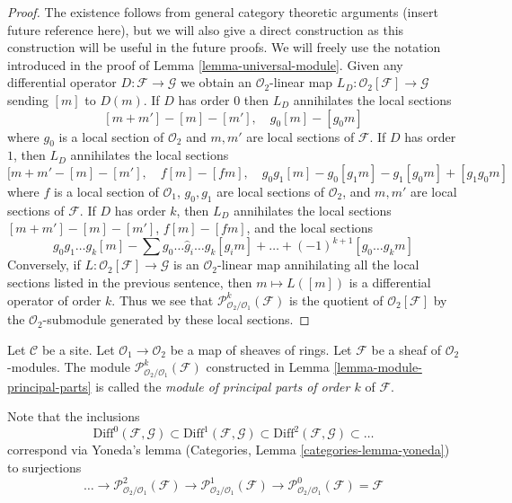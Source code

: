 \begin{proof}
The existence follows from general category theoretic arguments
(insert future reference here), but we will also give a direct
construction as this construction will be useful in the future proofs.
We will freely use the notation introduced in the proof of
Lemma \ref{lemma-universal-module}.
Given any differential operator $D : \mathcal{F} \to \mathcal{G}$
we obtain an $\mathcal{O}_2$-linear map
$L_D : \mathcal{O}_2[\mathcal{F}] \to \mathcal{G}$
sending $[m]$ to $D(m)$. If $D$ has order $0$
then $L_D$ annihilates the local sections
$$
[m + m'] - [m] - [m'],\quad
g_0[m] - [g_0m]
$$
where $g_0$ is a local section of $\mathcal{O}_2$ and $m, m'$
are local sections of $\mathcal{F}$. If $D$ has order $1$, then $L_D$
annihilates the local sections
$$
[m + m' - [m] - [m'],\quad
f[m] - [fm], \quad
g_0g_1[m] - g_0[g_1m] - g_1[g_0m] + [g_1g_0m]
$$
where $f$ is a local section of $\mathcal{O}_1$,
$g_0, g_1$ are local sections of $\mathcal{O}_2$, and
$m, m'$ are local sections of $\mathcal{F}$.
If $D$ has order $k$, then $L_D$ annihilates the local sections
$[m + m'] - [m] - [m']$, $f[m] - [fm]$, and the local sections
$$
g_0g_1\ldots g_k[m] - \sum g_0 \ldots \hat g_i \ldots g_k[g_im] + \ldots
+(-1)^{k + 1}[g_0\ldots g_km]
$$
Conversely, if $L : \mathcal{O}_2[\mathcal{F}] \to \mathcal{G}$ is an
$\mathcal{O}_2$-linear map annihilating all the local sections
listed in the previous sentence, then $m \mapsto L([m])$ is a
differential operator of order $k$. Thus we see that
$\mathcal{P}^k_{\mathcal{O}_2/\mathcal{O}_1}(\mathcal{F})$
is the quotient of $\mathcal{O}_2[\mathcal{F}]$
by the $\mathcal{O}_2$-submodule generated by these local sections.
\end{proof}

\begin{definition}
\label{definition-module-principal-parts}
Let $\mathcal{C}$ be a site.
Let $\mathcal{O}_1 \to \mathcal{O}_2$ be a map of sheaves of rings.
Let $\mathcal{F}$ be a sheaf of $\mathcal{O}_2$-modules.
The module $\mathcal{P}^k_{\mathcal{O}_2/\mathcal{O}_1}(\mathcal{F})$
constructed in Lemma \ref{lemma-module-principal-parts}
is called the {\it module of principal parts of order $k$} of $\mathcal{F}$.
\end{definition}

\noindent
Note that the inclusions
$$
\text{Diff}^0(\mathcal{F}, \mathcal{G}) \subset
\text{Diff}^1(\mathcal{F}, \mathcal{G}) \subset
\text{Diff}^2(\mathcal{F}, \mathcal{G}) \subset \ldots
$$
correspond via Yoneda's lemma (Categories, Lemma \ref{categories-lemma-yoneda})
to surjections
$$
\ldots \to \mathcal{P}^2_{\mathcal{O}_2/\mathcal{O}_1}(\mathcal{F})
\to \mathcal{P}^1_{\mathcal{O}_2/\mathcal{O}_1}(\mathcal{F})
\to \mathcal{P}^0_{\mathcal{O}_2/\mathcal{O}_1}(\mathcal{F}) = \mathcal{F}
$$

